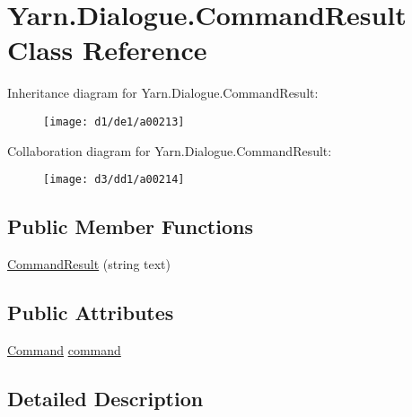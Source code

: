 \hypertarget{a00027}{\section{Yarn.\-Dialogue.\-Command\-Result Class Reference}
\label{a00027}
}


Inheritance diagram for Yarn.\-Dialogue.\-Command\-Result\-:
\nopagebreak
\begin{figure}[H]
\begin{center}
\leavevmode
\texttt{[image: d1/de1/a00213]}
\end{center}
\end{figure}


Collaboration diagram for Yarn.\-Dialogue.\-Command\-Result\-:
\nopagebreak
\begin{figure}[H]
\begin{center}
\leavevmode
\texttt{[image: d3/dd1/a00214]}
\end{center}
\end{figure}
\subsection*{Public Member Functions}
\begin{DoxyCompactItemize}
\item 
\hyperlink{a00027_a1a553422394fb0c854d1184985f993bb}{Command\-Result} (string text)
\end{DoxyCompactItemize}
\subsection*{Public Attributes}
\begin{DoxyCompactItemize}
\item 
\hyperlink{a00026_de/db9/a00159}{Command} \hyperlink{a00027_a420ca0984d6e5c33bb761654305c592e}{command}
\end{DoxyCompactItemize}


\subsection{Detailed Description}


